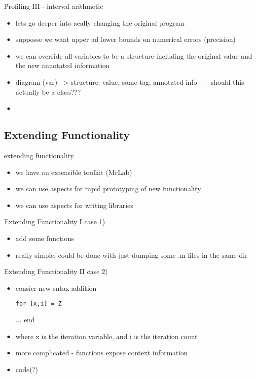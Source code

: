 \begin{frame}{Profiling III - interval arithmetic}
  \begin{itemize}
  \item lets go deeper into acally changing the original program
  \item supposse we want upper ad lower bounds on numerical errors
  (precision)
  \item we can override all variables to be a structure including the
  original value and the new annotated information
  \item diagram (var) --> structure: value, some tag, annotated info
  ---- should this actually be a class???
  \item 
  \end{itemize}
\end{frame}


\subsection*{Extending Functionality}

 extending functionality
\begin{itemize}
\item we have an extensible toolkit (McLab)
\item we can use aspects for rapid prototyping of new functionality
\item we can use aspects for writing libraries
\end{itemize}

\begin{frame}{Extending Functionality I}
case 1)
\begin{itemize}
\item add some functions
\item really simple, could be done with just dumping some .m files in the
        same dir
\end{itemize}
\end{frame}
\begin{frame}[fragile]{Extending Functionality II}
 case 2)
\begin{itemize}
\item
      consier new sntax addition
\begin{Verbatim}[commandchars=@\[\]]
      for [x,i] = Z
\end{Verbatim}
      ...
      end
\item where x is the iteration variable, and i is the iteration count
\item more complicated - functions expose context information
\item code(?)
\end{itemize}
\end{frame}





